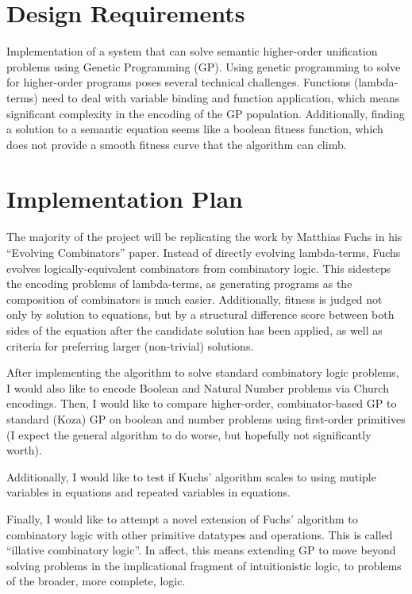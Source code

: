 \documentclass{article}
\begin{document}

\section{Design Requirements}

Implementation of a system that can solve semantic higher-order unification
problems using Genetic Programming (GP). Using genetic programming to
solve for higher-order programs poses several technical challenges.
Functions (lambda-terms) need to deal with variable binding and
function application, which means significant complexity in the
encoding of the GP population. Additionally, finding a solution to a
semantic equation seems like a boolean fitness function, which does
not provide a smooth fitness curve that the algorithm can climb. 

\section{Implementation Plan}

The majority of the project will be replicating the work by Matthias
Fuchs in his ``Evolving Combinators'' paper. Instead of directly
evolving lambda-terms, Fuchs evolves logically-equivalent combinators
from combinatory logic. This sidesteps the encoding problems of
lambda-terms, as generating programs as the composition of combinators
is much easier. Additionally, fitness is judged not only by solution
to equations, but by a structural difference score between both sides
of the equation after the candidate solution has been applied, as well
as criteria for preferring larger (non-trivial) solutions.

After implementing the algorithm to solve standard combinatory logic
problems, I would also like to encode Boolean and Natural Number
problems via Church encodings. Then, I would like to compare
higher-order, combinator-based GP to standard (Koza) GP on boolean and
number problems using first-order primitives (I expect the general
algorithm to do worse, but hopefully not significantly worth).

Additionally, I would like to test if Kuchs' algorithm scales to using
mutiple variables in equations and repeated variables in equations.

Finally, I would like to attempt a novel extension of Fuchs' algorithm
to combinatory logic with other primitive datatypes and operations.
This is called ``illative combinatory logic''. In affect, this means
extending GP to move beyond solving problems in the implicational
fragment of intuitionistic logic, to problems of the broader, more
complete, logic.
\end{document}
